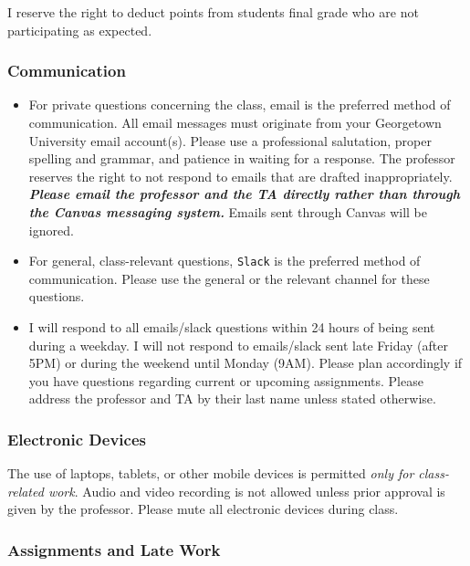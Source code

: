 \documentclass[
  12pt,
]{article}
\begin{document}
I reserve the right to deduct points from students final grade who are
not participating as expected.

\hypertarget{communication}{%
\subsubsection{Communication}\label{communication}}

\begin{itemize}
\item
  For private questions concerning the class, email is the preferred
  method of communication. All email messages must originate from your
  Georgetown University email account(s). Please use a professional
  salutation, proper spelling and grammar, and patience in waiting for a
  response. The professor reserves the right to not respond to emails
  that are drafted inappropriately. \textbf{\emph{Please email the
  professor and the TA directly rather than through the Canvas messaging
  system.}} Emails sent through Canvas will be ignored.
\item
  For general, class-relevant questions, \texttt{Slack} is the preferred
  method of communication. Please use the general or the relevant
  channel for these questions.
\item
  I will respond to all emails/slack questions within 24 hours of being
  sent during a weekday. I will not respond to emails/slack sent late
  Friday (after 5PM) or during the weekend until Monday (9AM). Please
  plan accordingly if you have questions regarding current or upcoming
  assignments. Please address the professor and TA by their last name
  unless stated otherwise.
\end{itemize}

\hypertarget{electronic-devices}{%
\subsubsection{Electronic Devices}\label{electronic-devices}}

The use of laptops, tablets, or other mobile devices is permitted
\emph{only for class-related work}. Audio and video recording is not
allowed unless prior approval is given by the professor. Please mute all
electronic devices during class.

\hypertarget{assignments-and-late-work}{%
\subsubsection{Assignments and Late
Work}\label{assignments-and-late-work}}
\end{document}
